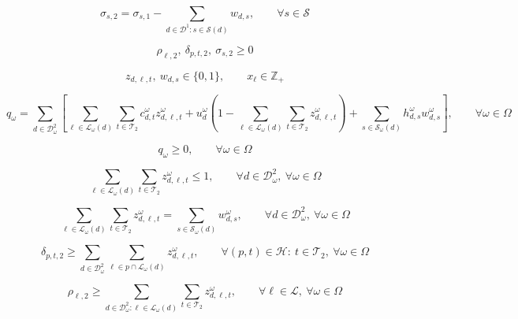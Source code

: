 \documentclass{article}
\begin{document}
\begin{equation}
\sigma_{s,2}
=
\sigma_{s,1} - \sum_{d\in \mathcal{D}^1:s\in\mathcal S(d)} w_{d,s},
\qquad \forall s \in \mathcal{S}
\tag{9}
\end{equation}

\begin{equation}
\rho_{\ell,2},\ \delta_{p,t,2},\ \sigma_{s,2} \ge 0
\tag{10}
\end{equation}

\begin{equation}
z_{d,\ell,t},\ w_{d,s} \in \{0,1\},
\qquad
x_\ell \in \mathbb{Z}_+
\tag{11}
\end{equation}

\begin{equation}
q_\omega
=
\sum_{d\in \mathcal{D}^2_\omega}
\left[
\sum_{\ell\in \mathcal{L}_\omega(d)} \sum_{t\in \mathcal{T}_2} c^\omega_{d,t} z^\omega_{d,\ell,t}
+ u^\omega_d \left(1 - \sum_{\ell\in \mathcal{L}_\omega(d)} \sum_{t\in \mathcal{T}_2} z^\omega_{d,\ell,t}\right)
+ \sum_{s\in \mathcal{S}_\omega(d)} h^\omega_{d,s} w^\omega_{d,s}
\right],
\qquad \forall \omega \in \Omega
\tag{12}
\end{equation}

\begin{equation}
q_\omega \ge 0,
\qquad \forall \omega \in \Omega
\tag{12a}
\end{equation}

\begin{equation}
\sum_{\ell\in \mathcal{L}_\omega(d)} \sum_{t\in \mathcal{T}_2} z^\omega_{d,\ell,t} \le 1,
\qquad \forall d \in \mathcal{D}^2_\omega,\ \forall \omega \in \Omega
\tag{13}
\end{equation}

\begin{equation}
\sum_{\ell\in \mathcal{L}_\omega(d)} \sum_{t\in \mathcal{T}_2} z^\omega_{d,\ell,t}
=
\sum_{s\in \mathcal{S}_\omega(d)} w^\omega_{d,s},
\qquad \forall d \in \mathcal{D}^2_\omega,\ \forall \omega \in \Omega
\tag{14}
\end{equation}

\begin{equation}
\delta_{p,t,2}
\ge
\sum_{d\in \mathcal{D}^2_\omega} \sum_{\ell\in p \cap \mathcal{L}_\omega(d)} z^\omega_{d,\ell,t},
\qquad \forall (p,t) \in \mathcal{H}:\ t \in \mathcal{T}_2,\ \forall \omega \in \Omega
\tag{15}
\end{equation}

\begin{equation}
\rho_{\ell,2}
\ge
\sum_{d\in \mathcal{D}^2_\omega:\ell\in \mathcal{L}_\omega(d)} \sum_{t\in \mathcal{T}_2} z^\omega_{d,\ell,t},
\qquad \forall \ell \in \mathcal{L},\ \forall \omega \in \Omega
\tag{16}
\end{equation}
\end{document}
